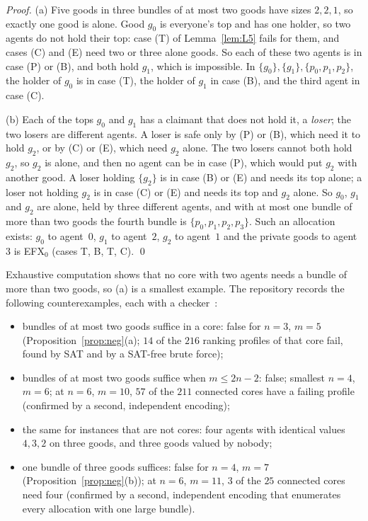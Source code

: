 \documentclass[runningheads,11pt]{llncs}
\newcommand{\efxz}{\texorpdfstring{\mbox{EFX$_0$}}{EFX0}}
\begin{document}
\begin{proof}
(a) Five goods in three bundles of at most two goods have sizes $2,2,1$, so exactly one good is alone. Good $g_0$ is everyone's top and has one holder, so two agents do not hold their top: case (T) of Lemma~\ref{lem:L5} fails for them, and cases (C) and (E) need two or three alone goods. So each of these two agents is in case (P) or (B), and both hold $g_1$, which is impossible. In $\{g_0\},\{g_1\},\{p_0,p_1,p_2\}$, the holder of $g_0$ is in case (T), the holder of $g_1$ in case (B), and the third agent in case (C).

(b) Each of the tops $g_0$ and $g_1$ has a claimant that does not hold it, a \emph{loser}; the two losers are different agents. A loser is safe only by (P) or (B), which need it to hold $g_2$, or by (C) or (E), which need $g_2$ alone. The two losers cannot both hold $g_2$, so $g_2$ is alone, and then no agent can be in case (P), which would put $g_2$ with another good. A loser holding $\{g_2\}$ is in case (B) or (E) and needs its top alone; a loser not holding $g_2$ is in case (C) or (E) and needs its top and $g_2$ alone. So $g_0$, $g_1$ and $g_2$ are alone, held by three different agents, and with at most one bundle of more than two goods the fourth bundle is $\{p_0,p_1,p_2,p_3\}$. Such an allocation exists: $g_0$ to agent~$0$, $g_1$ to agent~$2$, $g_2$ to agent~$1$ and the private goods to agent~$3$ is \efxz{} (cases T, B, T, C). \qed
\end{proof}

\noindent Exhaustive computation shows that no core with two agents needs a bundle of more than two goods, so (a) is a smallest example. The repository records the following counterexamples, each with a checker~\cite{Repo}:
\begin{itemize}
\item bundles of at most two goods suffice in a core: false for $n=3$, $m=5$ (Proposition~\ref{prop:neg}(a); $14$ of the $216$ ranking profiles of that core fail, found by SAT and by a SAT-free brute force);
\item bundles of at most two goods suffice when $m\le2n-2$: false; smallest $n=4$, $m=6$; at $n=6$, $m=10$, $57$ of the $211$ connected cores have a failing profile (confirmed by a second, independent encoding);
\item the same for instances that are not cores: four agents with identical values $4,3,2$ on three goods, and three goods valued by nobody;
\item one bundle of three goods suffices: false for $n=4$, $m=7$ (Proposition~\ref{prop:neg}(b)); at $n=6$, $m=11$, $3$ of the $25$ connected cores need four (confirmed by a second, independent encoding that enumerates every allocation with one large bundle).
\end{itemize}
\end{document}

